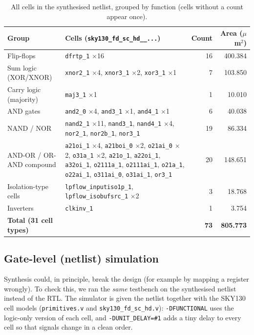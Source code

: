 \documentclass[10pt,a4paper,twocolumn]{article}
\newcommand{\umsq}{$\mu$m$^2$}
\newcommand{\cell}[1]{\texttt{#1}}
\begin{document}
\begin{table}[!htbp]
\centering
\footnotesize
\begin{tabular}{>{\raggedright\arraybackslash}p{1.7cm}>{\raggedright\arraybackslash}p{3.75cm}rr}
\toprule
\textbf{Group} & \textbf{Cells (\texttt{sky130\_fd\_sc\_hd\_\_...})} & \textbf{Count} & \textbf{Area (\umsq)} \\
\midrule
Flip-flops & \cell{dfrtp\_1} $\times$16 & 16 & 400.384 \\
Sum logic (XOR/XNOR) & \cell{xnor2\_1} $\times$4, \cell{xnor3\_1} $\times$2, \cell{xor3\_1} $\times$1 & 7 & 103.850 \\
Carry logic (majority) & \cell{maj3\_1} $\times$1 & 1 & 10.010 \\
AND gates & \cell{and2\_0} $\times$4, \cell{and3\_1} $\times$1, \cell{and4\_1} $\times$1 & 6 & 40.038 \\
NAND / NOR & \cell{nand2\_1} $\times$11, \cell{nand3\_1}, \cell{nand4\_1} $\times$4, \cell{nor2\_1}, \cell{nor2b\_1}, \cell{nor3\_1} & 19 & 86.334 \\
AND-OR / OR-AND compound & \cell{a21oi\_1} $\times$4, \cell{a21boi\_0} $\times$2, \cell{o21ai\_0} $\times$2, \cell{o31a\_1} $\times$2, \cell{a21o\_1}, \cell{a22oi\_1}, \cell{a32oi\_1}, \cell{o2111a\_1}, \cell{o2111ai\_1}, \cell{o21a\_1}, \cell{o22ai\_1}, \cell{o311ai\_0}, \cell{o31ai\_1}, \cell{or3\_1} & 20 & 148.651 \\
Isolation-type cells & \cell{lpflow\_inputiso1p\_1}, \cell{lpflow\_isobufsrc\_1} $\times$2 & 3 & 18.768 \\
Inverters & \cell{clkinv\_1} & 1 & 3.754 \\
\midrule
\textbf{Total (31 cell types)} & & \textbf{73} & \textbf{805.773} \\
\bottomrule
\end{tabular}
\caption{All cells in the synthesised netlist, grouped by function (cells without a count appear once).}\label{tab:cells}
\end{table}

\subsection{Gate-level (netlist) simulation}

Synthesis could, in principle, break the design (for example by mapping a register wrongly). To check this,
we ran the \emph{same} testbench on the synthesised netlist instead of the RTL. The simulator is given the
netlist together with the SKY130 cell models (\texttt{primitives.v} and \texttt{sky130\_fd\_sc\_hd.v}):
\texttt{-DFUNCTIONAL} uses the logic-only version of each cell, and \texttt{-DUNIT\_DELAY=\#1} adds a tiny delay
to every cell so that signals change in a clean order.
\end{document}
